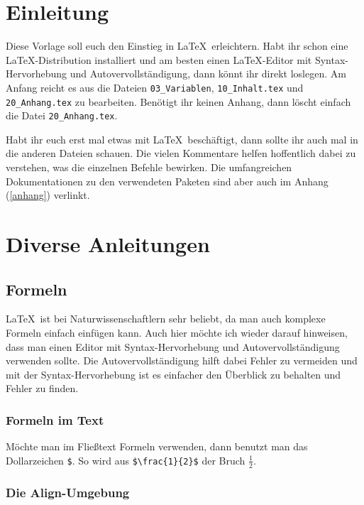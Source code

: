 \section{Einleitung}

Diese Vorlage soll euch den Einstieg in \LaTeX\ erleichtern. Habt ihr schon eine \LaTeX-Distribution installiert und am besten einen \LaTeX-Editor mit Syntax-Hervorhebung und Autovervollständigung, dann könnt ihr direkt loslegen. Am Anfang reicht es aus die Dateien \verb+03_Variablen+, \verb+10_Inhalt.tex+ und \verb+20_Anhang.tex+ zu bearbeiten. Benötigt ihr keinen Anhang, dann löscht einfach die Datei \verb+20_Anhang.tex+.

Habt ihr euch erst mal etwas mit \LaTeX\ beschäftigt, dann sollte ihr auch mal in die anderen Dateien schauen. Die vielen Kommentare helfen hoffentlich dabei zu verstehen, was die einzelnen Befehle bewirken. Die umfangreichen Dokumentationen zu den verwendeten Paketen sind aber auch im Anhang (\ref{anhang}) verlinkt.

\newpage
\section{Diverse Anleitungen}
\subsection{Formeln}

\LaTeX\ ist bei Naturwissenschaftlern sehr beliebt, da man auch komplexe Formeln einfach einfügen kann. Auch hier möchte ich wieder darauf hinweisen, dass man einen Editor mit Syntax-Hervorhebung und Autovervollständigung verwenden sollte. Die Autovervollständigung hilft dabei Fehler zu vermeiden und mit der Syntax-Hervorhebung ist es einfacher den Überblick zu behalten und Fehler zu finden.

\subsubsection{Formeln im Text}

Möchte man im Fließtext Formeln verwenden, dann benutzt man das Dollarzeichen \verb+$+. So wird aus \verb+$\frac{1}{2}$+ der Bruch $\frac{1}{2}$.

\subsubsection{Die Align-Umgebung}

